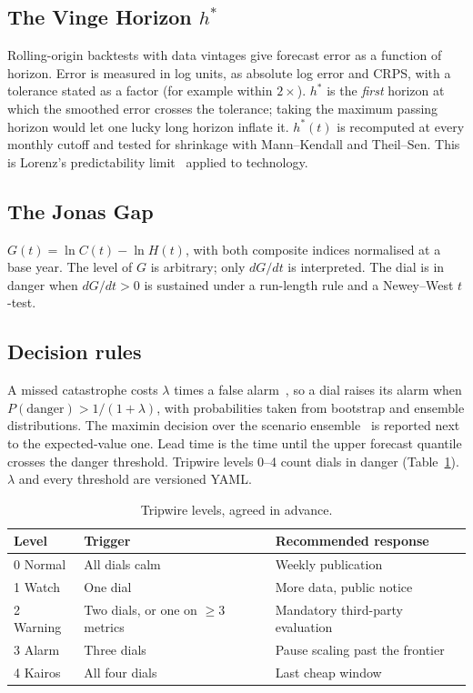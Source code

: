 \documentclass[11pt]{article}
\begin{document}
\subsection{The Vinge Horizon $h^*$}
Rolling-origin backtests with data vintages give forecast error as a function of
horizon. Error is measured in log units, as absolute log error and CRPS, with a
tolerance stated as a factor (for example within $2\times$). $h^*$ is the
\emph{first} horizon at which the smoothed error crosses the tolerance;
taking the maximum passing horizon would let one lucky long horizon inflate it.
$h^*(t)$ is recomputed at every monthly cutoff and tested for shrinkage with
Mann--Kendall and Theil--Sen. This is Lorenz's predictability limit~\cite{lorenz1963}
applied to technology.

\subsection{The Jonas Gap}
$G(t)=\ln C(t)-\ln H(t)$, with both composite indices normalised at a base year.
The level of $G$ is arbitrary; only $dG/dt$ is interpreted. The dial is in danger
when $dG/dt>0$ is sustained under a run-length rule and a Newey--West $t$-test.

\subsection{Decision rules}
A missed catastrophe costs $\lambda$ times a false alarm~\cite{jonas1984}, so a
dial raises its alarm when $P(\text{danger}) > 1/(1+\lambda)$, with
probabilities taken from bootstrap and ensemble distributions. The maximin
decision over the scenario ensemble~\cite{rawls1971} is reported next to the
expected-value one. Lead time is the time until the upper forecast quantile
crosses the danger threshold. Tripwire levels 0--4 count dials in danger
(Table~\ref{tab:levels}). $\lambda$ and every threshold are versioned YAML.

\begin{table}[h]
\centering
\begin{tabular}{@{}lll@{}}
\toprule
Level & Trigger & Recommended response\\
\midrule
0 Normal & All dials calm & Weekly publication\\
1 Watch & One dial & More data, public notice\\
2 Warning & Two dials, or one on $\ge 3$ metrics & Mandatory third-party evaluation\\
3 Alarm & Three dials & Pause scaling past the frontier\\
4 Kairos & All four dials & Last cheap window\\
\bottomrule
\end{tabular}
\caption{Tripwire levels, agreed in advance.}
\label{tab:levels}
\end{table}
\end{document}
